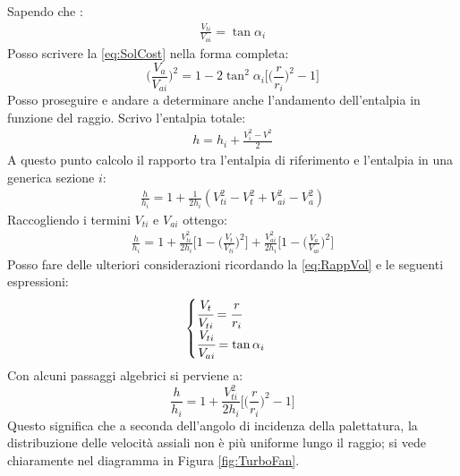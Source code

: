 Sapendo che :
\begin{align*}
\frac{V_{ti}}{V_{ai}} = \tan \alpha_i
\end{align*}
Posso scrivere la \ref{eq:SolCost} nella forma completa:
\begin{equation}
\boxed{ \bigg( \frac{V_a}{V_{ai}} \bigg)^2 = 1- 2 \tan^2 \alpha_i \bigg[ \bigg( \frac{r}{r_i} \bigg)^2 -1 \bigg] }
\label{eq:RappVol}
\end{equation}
Posso proseguire e andare a determinare anche l'andamento dell'entalpia in funzione del raggio.
Scrivo l'entalpia totale:
\begin{align*}
h = h_i + \frac{V_i^2 - V^2}{2}
\end{align*}
A questo punto calcolo il rapporto tra l'entalpia di riferimento e l'entalpia in una generica sezione $i$:
\begin{align*}
\frac{h}{h_i} = 1+ \frac{1}{2 h_i} (V_{ti}^2 - V_t^2 + V_{ai}^2 -V_a^2)
\end{align*}
Raccogliendo i termini $V_{ti}$ e $V_{ai}$ ottengo:
\begin{align*}
\frac{h}{h_i} = 1+ \frac{V_{ti}^2}{2 h_i} \bigg[ 1- \bigg( \frac{V_t}{V_{ti}} \bigg)^2 \bigg] + \frac{V_{ai}^2}{2 h_i} \bigg[ 1- \bigg( \frac{V_a}{V_{ai}} \bigg)^2 \bigg]
\end{align*}
Posso fare delle ulteriori considerazioni ricordando la \ref{eq:RappVol} e le seguenti espressioni:
\begin{align*}
\begin{cases}
\cfrac{V_t}{V_{ti}} = \cfrac{r}{r_i}\\
\cfrac{V_{ti}}{V_{ai}} = \tan \alpha_i
\end{cases}
\end{align*}
Con alcuni passaggi algebrici si perviene a:
\begin{equation}
\boxed{ \frac{h}{h_i} = 1+ \frac{V_{ti}^2}{2h_i} \bigg[ \bigg( \frac{r}{r_i} \bigg)^2 -1 \bigg] }
\label{eq:rappEntalpie}
\end{equation}
Questo significa che a seconda dell'angolo di incidenza della palettatura, la distribuzione delle velocità assiali non è più uniforme lungo il raggio; si vede chiaramente nel diagramma in Figura \ref{fig:TurboFan}.
